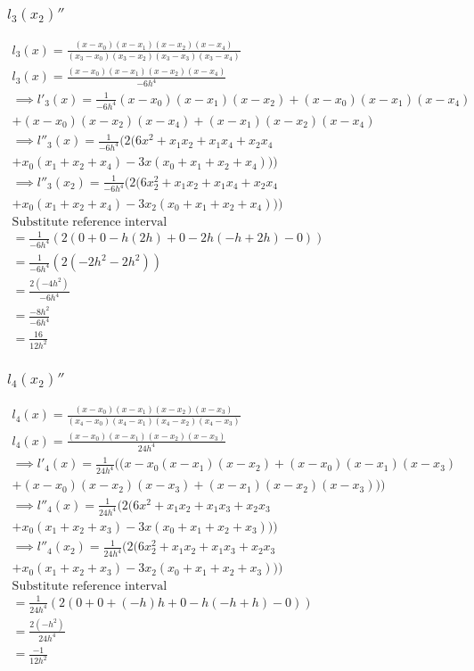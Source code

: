 \subsubsection{$l_{3}(x_{2})''$}
\begin{align*}
    l_{3}(x) = \frac{(x - x_0)(x - x_1)(x - x_2)(x - x_4)}{(x_3 - x_0)(x_3 - x_2)(x_3-x_3)(x_3-x_4)} \\
    l_{3}(x) = \frac{(x - x_0)(x - x_1)(x - x_2)(x - x_4)}{-6h^4} 
    \\
    \implies l'_{3}(x) = \frac{1}{-6h^4} (x - x_0) (x - x_1) (x - x_2) + (x - x_0) (x - x_1) (x - x_4) \\ + (x - x_0) (x - x_2) (x - x_4) + (x - x_1) (x - x_2) (x - x_4)
    \\
    \implies l''_{3}(x) = \frac{1}{-6h^4} (2 (6 x^2 + x_1 x_2 + x_1 x_4 + x_2 x_4 \\ + x_0 (x_1 + x_2 + x_4) - 3 x (x_0 + x_1 + x_2 + x_4))) 
    \\
    \implies l''_{3}(x_2) = \frac{1}{-6h^4} (2 (6 x_{2}^2 + x_1 x_2 + x_1 x_4 + x_2 x_4 \\ + x_0 (x_1 + x_2 + x_4) - 3 x_2 (x_0 + x_1 + x_2 + x_4)))
    \\
\text{Substitute reference interval} \\
= \frac{1}{-6h^4} (2(0 + 0 - h (2h) + 0 - 2h (-h + 2h) - 0)) \\
= \frac{1}{-6h^4} (2 (-2h^2 -2h^2)) \\
=\frac{2(-4h^2)}{-6h^4}\\
=\frac{-8h^2}{-6h^4}\\
=\frac{16}{12h^2}
\end{align*}

\subsubsection{$l_{4}(x_{2})''$}
\begin{align*}
    l_{4}(x) = \frac{(x - x_0)(x - x_1)(x - x_2)(x - x_3)}{(x_4 - x_0)(x_4 - x_1)(x_4-x_2)(x_4-x_3)} \\
    l_{4}(x) = \frac{(x - x_0)(x - x_1)(x - x_2)(x - x_3)}{24h^4} 
    \\
    \implies l'_{4}(x) = \frac{1}{24h^4} ((x - x_0 (x - x_1) (x - x_2) + (x - x_0) (x - x_1) (x - x_3) \\ + (x - x_0) (x - x_2) (x - x_3) + (x - x_1) (x - x_2) (x - x_3))) \\
    \implies l''_{4}(x) = \frac{1}{24h^4} (2 (6 x^2 + x_1 x_2 + x_1 x_3 + x_2 x_3 \\ + x_0 (x_1 + x_2 + x_3) - 3 x (x_0 + x_1 + x_2 + x_3))) 
    \\
    \implies l''_{4}(x_2) = \frac{1}{24h^4} (2 (6 x_{2}^2 + x_1 x_2 + x_1 x_3 + x_2 x_3 \\ + x_0 (x_1 + x_2 + x_3) - 3 x_2 (x_0 + x_1 + x_2 + x_3))) \\
\text{Substitute reference interval} \\
= \frac{1}{24h^4} (2(0 + 0 + (-h)h + 0 - h(-h + h) - 0)) \\
= \frac{2(-h^2)}{24h^4} \\
= \frac{-1}{12h^2}
\end{align*}

